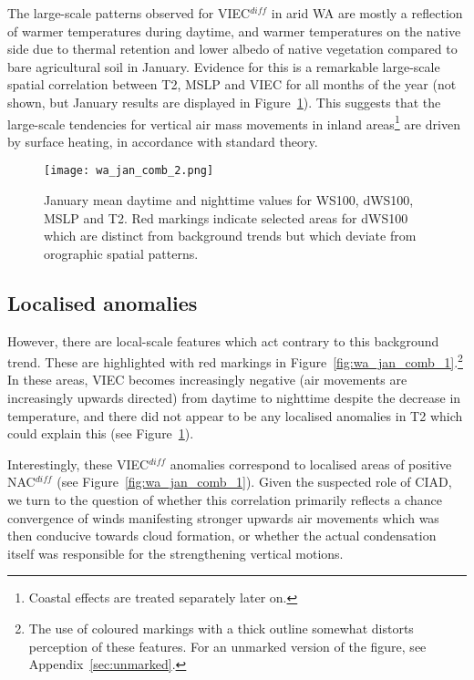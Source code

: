 The large-scale patterns observed for \ac{VIEC}$^{diff}$ in arid \ac{WA} are mostly a reflection of warmer temperatures during daytime, and warmer temperatures on the native side due to thermal retention and lower albedo of native vegetation compared to bare agricultural soil in January. Evidence for this is a remarkable large-scale spatial correlation between \ac{T2}, \ac{MSLP} and \ac{VIEC} for all months of the year (not shown, but January results are displayed in Figure~\ref{fig:wa_jan_comb_2}). This suggests that the large-scale tendencies for vertical air mass movements in inland areas\footnote{Coastal effects are treated separately later on.} are driven by surface heating, in accordance with standard theory.

\begin{figure}[!ht]
	\centering
	\texttt{[image: wa\_jan\_comb\_2.png]}
	\caption[January means for selected variables 2]{January mean daytime and nighttime values for \acs{WS100}, \acs{dWS100}, \acs{MSLP} and \acs{T2}. Red markings indicate selected areas for \acs{dWS100} which are distinct from background trends but which deviate from orographic spatial patterns.}
	\label{fig:wa_jan_comb_2}
\end{figure}

\subsection{Localised anomalies}

However, there are local-scale features which act contrary to this background trend. These are highlighted with red markings in Figure~\ref{fig:wa_jan_comb_1}.\footnote{The use of coloured markings with a thick outline somewhat distorts perception of these features. For an unmarked version of the figure, see Appendix~\ref{sec:unmarked}.} In these areas, \ac{VIEC} becomes increasingly negative (air movements are increasingly upwards directed) from daytime to nighttime despite the decrease in temperature, and there did not appear to be any localised anomalies in \ac{T2} which could explain this (see Figure~\ref{fig:wa_jan_comb_2}).

Interestingly, these \ac{VIEC}$^{diff}$ anomalies correspond to localised areas of positive \ac{NAC}$^{diff}$ (see Figure~\ref{fig:wa_jan_comb_1}). Given the suspected role of \ac{CIAD}, we turn to the question of whether this correlation primarily reflects a chance convergence of winds manifesting stronger upwards air movements which was then conducive towards cloud formation, or whether the actual condensation itself was responsible for the strengthening vertical motions.


